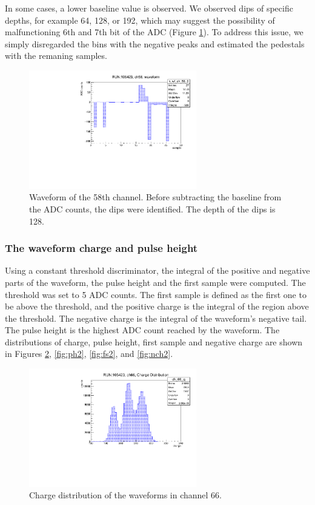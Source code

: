 In some cases, a lower baseline value is observed. We observed dips of specific depths, 
for example 64, 128, or 192, which may suggest the possibility of malfunctioning 6th 
and 7th bit of the ADC (Figure \ref{fig:dips}). 
To address this issue, we simply disregarded the bins with the 
negative peaks and estimated the pedestals with the remaning samples.
\begin{figure}[!h]
  \centering
  \includegraphics[width=0.65\textwidth]{figures/pdf/wf_ch58_1.pdf}
  \caption{Waveform of the 58th channel. Before subtracting the baseline from the ADC counts, the dips were identified. The depth of the dips is 128.}
 \label{fig:dips}
\end{figure}
\subsubsection{The waveform charge and pulse height}\label{threshold}
Using a constant threshold discriminator, the integral of the positive and negative parts of the waveform, 
the pulse height and the first sample were computed. The threshold was set to 5 ADC counts. 
The first sample is defined as the first one to be above the threshold, and the positive charge 
is the integral of the region above the threshold. The negative charge is the integral of the waveform's 
negative tail. The pulse height is the highest ADC count reached by the waveform. The distributions of 
charge, pulse height, first sample and negative charge are shown in Figures \ref{fig:ch1}, \ref{fig:ph2}, \ref{fig:fs2}, and \ref{fig:nch2}.

\begin{figure}[!h]
      \centering
      \includegraphics[width=0.65\textwidth]{figures/pdf/charge.pdf}
      \caption{Charge distribution of the waveforms in channel 66.}
      \label{fig:ch1}
  \end{figure}

